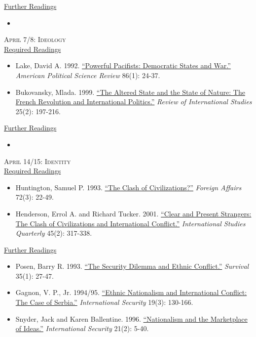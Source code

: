 \documentclass[11pt]{article}
\begin{document}
\noindent \underline{Further Readings}

\begin{itemize}
\item 
\end{itemize}


\noindent \textsc{April 7/8: Ideology} \\

\noindent \underline{Required Readings}

\begin{itemize}
\item Lake, David A. 1992. \href{http://www.jstor.org/stable/1964013}{``Powerful Pacifists: Democratic States and War.''} \textit{American Political Science Review} 86(1): 24-37.
\item Bukovansky, Mlada. 1999. \href{http://www.jstor.org/stable/20097590}{``The Altered State and the State of Nature: The French Revolution and International Politics.''} \textit{Review of International Studies} 25(2): 197-216.
\end{itemize}

\noindent \underline{Further Readings}

\begin{itemize}
\item 
\end{itemize}


\noindent \textsc{April 14/15: Identity} \\

\noindent \underline{Required Readings}

\begin{itemize}
\item Huntington, Samuel P. 1993. \href{http://www.jstor.org/stable/20045621}{``The Clash of Civilizations?''} \textit{Foreign Affairs} 72(3): 22-49.
\item Henderson, Errol A. and Richard Tucker. 2001. \href{http://www.jstor.org/stable/3096113}{``Clear and Present Strangers: The Clash of Civilizations and International Conflict.''} \textit{International Studies Quarterly} 45(2): 317-338.
\end{itemize}

\noindent \underline{Further Readings}

\begin{itemize}
\item Posen, Barry R. 1993. \href{http://www.tandfonline.com/doi/abs/10.1080/00396339308442672?journalCode=tsur20}{``The Security Dilemma and Ethnic Conflict.''} \textit{Survival} 35(1): 27-47.
\item Gagnon, V. P., Jr. 1994/95. \href{http://www.jstor.org/stable/2539081}{``Ethnic Nationalism and International Conflict: The Case of Serbia.''} \textit{International Security} 19(3): 130-166.
\item Snyder, Jack and Karen Ballentine. 1996. \href{http://www.jstor.org/stable/2539069}{``Nationalism and the Marketplace of Ideas.''} \textit{International Security} 21(2): 5-40.
\end{itemize}
\end{document}

